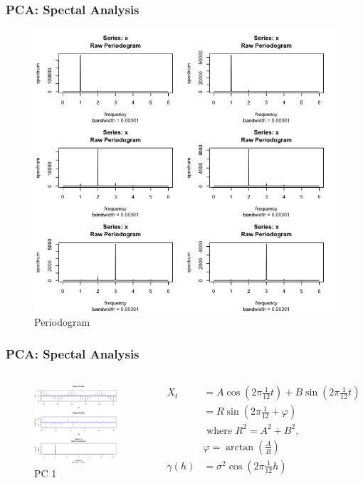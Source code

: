 \documentclass{beamer}
\begin{document}
\begin{frame}
\frametitle{PCA: Spectal Analysis}
\begin{figure}
\centering
\includegraphics[width=0.7\linewidth]{../img/PCA_periodogram}
\caption{Periodogram}
\label{fig:pcaperiodogram}
\end{figure}
\end{frame}

\begin{frame}
\frametitle{PCA: Spectal Analysis}
\begin{columns}
\column{2.5in}
\begin{figure}
\centering
\includegraphics[width=0.7\linewidth]{../img/PCA_pc1}
\caption{PC 1}
\label{fig:pcapc1}
\end{figure}
\column{2.5in}
\begin{align*}
X_t &= A\cos(2\pi\frac{1}{12}t) + B\sin(2\pi\frac{1}{12}t)  \\ 
&= R\sin(2\pi\frac{1}{12} + \varphi)\\
& \text{ where } R^2 = A^2 + B^2, \\
&\varphi = \arctan(\frac{A}{B}) \\
\gamma(h) &= \sigma^2\cos(2\pi\frac{1}{12}h) \\
\end{align*}
\end{columns}
\end{frame}
\end{document}
